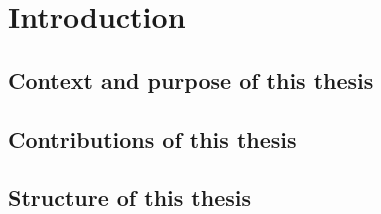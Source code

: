 \chapter{Introduction}
\section{Context and purpose of this thesis}

\section{Contributions of this thesis}

\section{Structure of this thesis}

